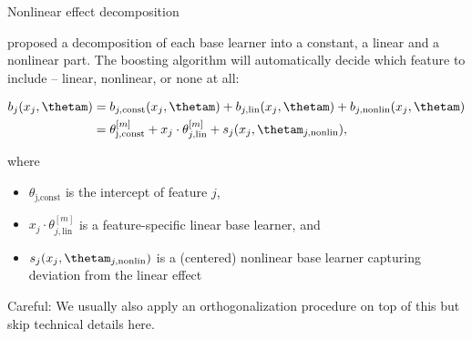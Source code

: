 \documentclass[11pt,compress,t,notes=noshow, xcolor=table]{beamer}
\begin{document}
\begin{vbframe}{Nonlinear effect decomposition}



proposed a decomposition of each base learner into a
constant, a linear and a nonlinear part.
The boosting algorithm will automatically decide which feature to include --
linear, nonlinear, or none at all:

\vspace{-0.7cm}

\begin{align*}
b_j(x_j, \thetam) & = b_{j, \text{const}}(x_j, \thetam) + b_{j, \text{lin}}
(x_j, \thetam) + b_{j, \text{nonlin}}(x_j, \thetam)\\
 & = \theta^{[m]}_\text{j,const} + x_j \cdot \theta^{[m]}_{j, \text{lin}} +
 s_j(x_j, \thetam_{j,\text{nonlin}}),
\end{align*}

\small
where
\begin{itemize}
  \small
  \item $\theta_\text{j,const}$ is the intercept of feature $j$,
  \item $x_j \cdot \theta^{[m]}_{j, \text{lin}}$ is a feature-specific linear
  base learner, and
  \item $s_j(x_j, \thetam_{j,\text{nonlin}})$ is a (centered) nonlinear base
  learner capturing deviation from the linear effect 
\end{itemize}

Careful: We usually also apply an orthogonalization procedure on top of this but skip technical details here. 

\framebreak




\end{vbframe}
\end{document}
